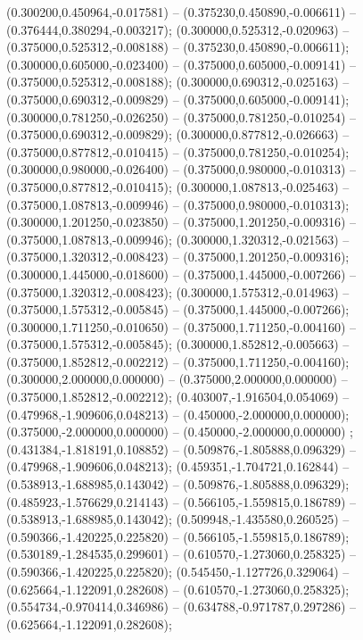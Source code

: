  (0.300200,0.450964,-0.017581) -- (0.375230,0.450890,-0.006611) -- (0.376444,0.380294,-0.003217);
 (0.300000,0.525312,-0.020963) -- (0.375000,0.525312,-0.008188) -- (0.375230,0.450890,-0.006611);
 (0.300000,0.605000,-0.023400) -- (0.375000,0.605000,-0.009141) -- (0.375000,0.525312,-0.008188);
 (0.300000,0.690312,-0.025163) -- (0.375000,0.690312,-0.009829) -- (0.375000,0.605000,-0.009141);
 (0.300000,0.781250,-0.026250) -- (0.375000,0.781250,-0.010254) -- (0.375000,0.690312,-0.009829);
 (0.300000,0.877812,-0.026663) -- (0.375000,0.877812,-0.010415) -- (0.375000,0.781250,-0.010254);
 (0.300000,0.980000,-0.026400) -- (0.375000,0.980000,-0.010313) -- (0.375000,0.877812,-0.010415);
 (0.300000,1.087813,-0.025463) -- (0.375000,1.087813,-0.009946) -- (0.375000,0.980000,-0.010313);
 (0.300000,1.201250,-0.023850) -- (0.375000,1.201250,-0.009316) -- (0.375000,1.087813,-0.009946);
 (0.300000,1.320312,-0.021563) -- (0.375000,1.320312,-0.008423) -- (0.375000,1.201250,-0.009316);
 (0.300000,1.445000,-0.018600) -- (0.375000,1.445000,-0.007266) -- (0.375000,1.320312,-0.008423);
 (0.300000,1.575312,-0.014963) -- (0.375000,1.575312,-0.005845) -- (0.375000,1.445000,-0.007266);
 (0.300000,1.711250,-0.010650) -- (0.375000,1.711250,-0.004160) -- (0.375000,1.575312,-0.005845);
 (0.300000,1.852812,-0.005663) -- (0.375000,1.852812,-0.002212) -- (0.375000,1.711250,-0.004160);
 (0.300000,2.000000,0.000000) -- (0.375000,2.000000,0.000000) -- (0.375000,1.852812,-0.002212);
 (0.403007,-1.916504,0.054069) -- (0.479968,-1.909606,0.048213) -- (0.450000,-2.000000,0.000000);
 (0.375000,-2.000000,0.000000) -- (0.450000,-2.000000,0.000000) ;
 (0.431384,-1.818191,0.108852) -- (0.509876,-1.805888,0.096329) -- (0.479968,-1.909606,0.048213);
 (0.459351,-1.704721,0.162844) -- (0.538913,-1.688985,0.143042) -- (0.509876,-1.805888,0.096329);
 (0.485923,-1.576629,0.214143) -- (0.566105,-1.559815,0.186789) -- (0.538913,-1.688985,0.143042);
 (0.509948,-1.435580,0.260525) -- (0.590366,-1.420225,0.225820) -- (0.566105,-1.559815,0.186789);
 (0.530189,-1.284535,0.299601) -- (0.610570,-1.273060,0.258325) -- (0.590366,-1.420225,0.225820);
 (0.545450,-1.127726,0.329064) -- (0.625664,-1.122091,0.282608) -- (0.610570,-1.273060,0.258325);
 (0.554734,-0.970414,0.346986) -- (0.634788,-0.971787,0.297286) -- (0.625664,-1.122091,0.282608);
